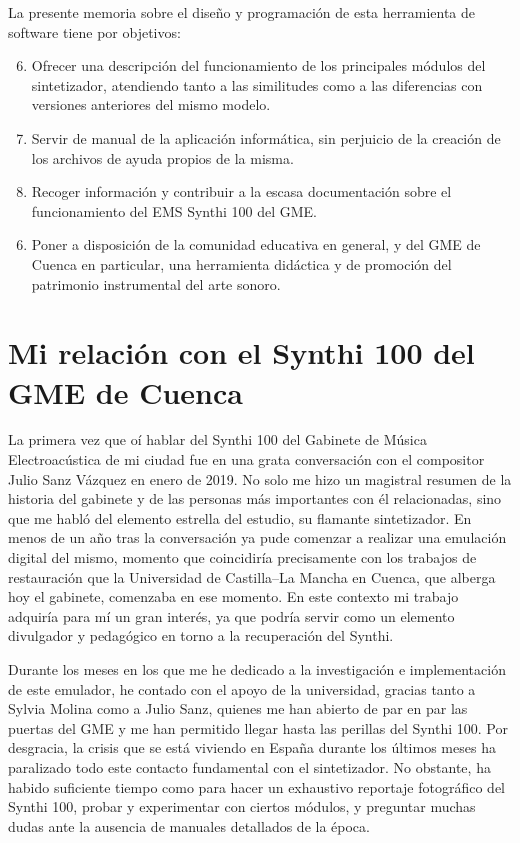 La presente memoria sobre el diseño y programación de esta herramienta de software tiene por objetivos:

\begin{enumerate}
	\setcounter{enumi}{5}
	\item Ofrecer una descripción del funcionamiento de los principales módulos del sintetizador, atendiendo tanto a las similitudes como a las diferencias con versiones anteriores del mismo modelo.
	\item Servir de manual de la aplicación informática, sin perjuicio de la creación de los archivos de ayuda propios de la misma.
	\item Recoger información y contribuir a la escasa documentación sobre el funcionamiento del EMS Synthi 100 del GME.
\end{enumerate}



\begin{enumerate}
	\setcounter{enumi}{5}
	\item Poner a disposición de la comunidad educativa en general, y del GME de Cuenca en particular, una herramienta didáctica y de promoción del patrimonio instrumental del arte sonoro.
\end{enumerate}



\section[Mi relación con el Synthi 100\dots]{Mi relación con el Synthi 100 del GME de Cuenca }

La primera vez que oí hablar del Synthi 100 del Gabinete de Música Electroacústica de mi ciudad fue en una grata conversación con el compositor Julio Sanz Vázquez en enero de 2019. No solo me hizo un magistral resumen de la historia del gabinete y de las personas más importantes con él relacionadas, sino que me habló del elemento estrella del estudio, su flamante sintetizador. En menos de un año tras la conversación ya pude comenzar a realizar una emulación digital del mismo, momento que coincidiría precisamente con los trabajos de restauración que la Universidad de Castilla--La Mancha en Cuenca, que alberga hoy el gabinete, comenzaba en ese momento. En este contexto mi trabajo adquiría para mí un gran interés, ya que podría servir como un elemento divulgador y pedagógico en torno a la recuperación del Synthi. 

Durante los meses en los que me he dedicado a la investigación e implementación de este emulador, he contado con el apoyo de la universidad, gracias tanto a Sylvia Molina como a Julio Sanz, quienes me han abierto de par en par las puertas del GME y me han permitido llegar hasta las perillas del Synthi 100. Por desgracia, la crisis que se está viviendo en España durante los últimos meses ha paralizado todo este contacto fundamental con el sintetizador. No obstante, ha habido suficiente tiempo como para hacer un exhaustivo reportaje fotográfico del Synthi 100, probar y experimentar con ciertos módulos, y preguntar muchas dudas ante la ausencia de manuales detallados de la época.


